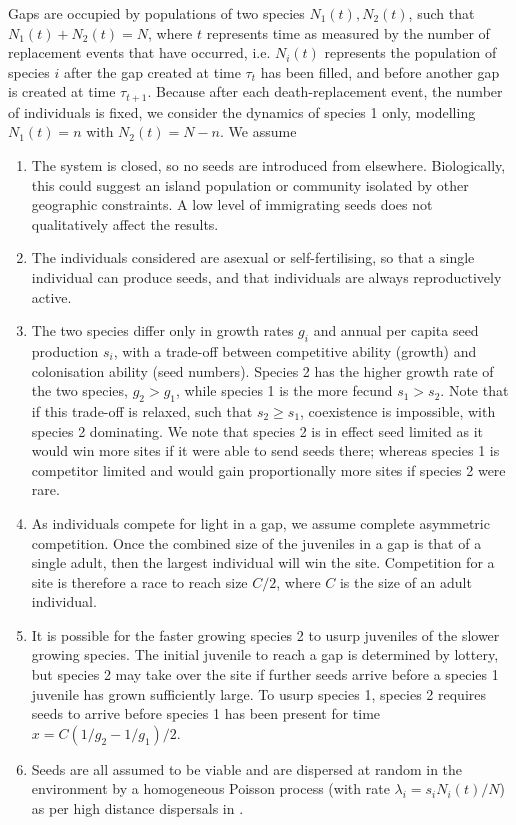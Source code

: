 Gaps are occupied by populations of two species $N_1(t), N_2(t)$, such that $N_1(t) + N_2(t) = N$, where $t$ represents time as measured by the number of replacement events that have occurred, i.e. $N_i(t)$ represents the population of species $i$ after the gap created at time $\tau_t$ has been filled, and before another gap is created at time $\tau_{t+1}$. Because after each death-replacement event, the number of individuals is fixed, we consider the dynamics of species 1 only, modelling $N_1(t)=n$ with $N_2(t)=N-n$. We assume 
\begin{enumerate}
\item The system is closed, so no seeds are introduced from elsewhere. Biologically, this could suggest an island population or community isolated by other geographic constraints. A low level of immigrating seeds does not qualitatively affect the results.
\item The individuals considered are asexual or self-fertilising, so that a single individual can produce seeds, and that individuals are always reproductively active.
\item The two species differ only in growth rates $g_i$ and annual per capita seed production $s_i$, with a trade-off between competitive ability (growth) and colonisation ability (seed numbers). Species 2 has the higher growth rate of the two species, $g_2>g_1$, while species 1 is the more fecund $s_1>s_2$. Note that if this trade-off is relaxed, such that $s_2\geq s_1$, coexistence is impossible, with species 2 dominating. We note that species 2 is in effect seed limited as it would win more sites if it were able to send seeds there; whereas species 1 is competitor limited and would gain proportionally more sites if species 2 were rare.
\item As individuals compete for light in a gap, we assume complete asymmetric competition. Once the combined size of the juveniles in a gap is that of a single adult, then the largest individual will win the site. Competition for a site is therefore a race to reach size $C/2$, where $C$ is the size of an adult individual.
\item It is possible for the faster growing species 2 to usurp juveniles of the slower growing species. The initial juvenile to reach a gap is determined by lottery, but species 2 may take over the site if further seeds arrive before a species 1 juvenile has grown sufficiently large. To usurp species 1, species 2 requires seeds to arrive before species 1 has been present for time $x=C(1/g_2-1/g_1)/2$.
\item Seeds are all assumed to be viable and are dispersed at random in the environment by a homogeneous Poisson process (with rate $\lambda_i =s_iN_i(t)/N$) as per high distance dispersals in \cite{clark1999interpreting}.

\end{enumerate}
